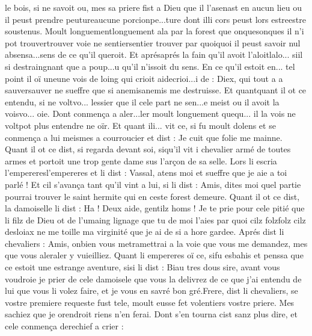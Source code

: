 \documentclass{article}
\begin{document}
\begin{pages}
   le bois, 
   si ne savoit ou, mes sa priere fist a Dieu que il l’asenast en aucun lieu 
   ou il peust prendre peutureaucune porcionpe...ture 
   dont illi cors 
   peust lors estreestre soustenus. 
   Moult longuementlonguement ala 
   par la forest que 
   onquesonques il n’i pot 
   trouvertrouver voie ne 
      sentiersentier trouver 
   par quoiquoi il peust savoir nul 
   absensa...sens de ce qu’il queroit. 
   Et aprésaprés la fain qu’il avoit 
   l'aloitlalo...
   siil si destraingnant 
   que a poup...u qu’il n’issoit du sens. \pend
\pstart En ce qu’il estoit 
  en... tel point 
   il oï 
   uneune vois de loing qui 
   crioit aidecrioi...i de :
               Diex, qui tout a a 
                  sauversauver 
                  ne sueffre que si anemisanemis 
                  me destruisse. 
   Et quantquant il ot ce entendu, si ne 
   voltvo... lessier que il cele part 
   ne sen...e meist 
   ou il avoit la voisvo... oie. 
   Dont conmença a aler...ler moult longuement 
   quequ... il la vois 
   ne voltpot plus entendre ne oïr.
   Et quant ili... vit ce, 
   si fu moult dolens et se conmença a lui meismes a courroucier et dist :
   Je cuit que folie me mainne.
   Quant il ot ce dist, si regarda devant soi, siqu'il vit i 
   chevalier armé de toutes armes et portoit une 
   trop gente dame sus l’arçon de sa selle.
   Lors li escria 
   l’empereresl'empereres et li dist :
   Vassal, atens moi et sueffre que je aie a toi parlé !
   Et cil s’avança tant qu’il vint a lui, si li dist :
   Amis, dites moi quel partie pourrai trouver le
      saint hermite 
      qui en ceste forest demeure.
   Quant il ot ce dist, la damoiselle li dist :
   Ha ! Deux aide, gentilz homs ! Je te prie pour cele pitié que li filz de Dieu ot
      de l’umaing lignage que tu de moi l’aies par quoi 
      cilz 
         folzfolz cilz desloiax
      ne me toille ma virginité que je ai de si a hore gardee. 
   Aprés dist li chevaliers :
   Amis, onbien 
      vous metramettrai a la voie que vous 
      me demandez, 
      mes que vous aleraler y vuieilliez.
   Quant li empereres oï ce, 
   sifu esbahis et penssa que
   ce estoit une estrange aventure, 
   sisi li dist :
   Biau tres dous sire, avant vous voudroie je prier de 
      cele damoisele
      que vous la delivrez de ce que j’ai entendu de lui que vous li volez faire,
      et je vous en savré bon gré.Frere, dist li chevaliers, 
      se vostre premiere requeste fust tele,
      moult eusse fet volentiers vostre priere. Mes sachiez que je orendroit riens n’en ferai.
   Dont s’en tourna cist sanz plus dire, et cele conmença derechief a crier :

\end{pages}
\end{document}
